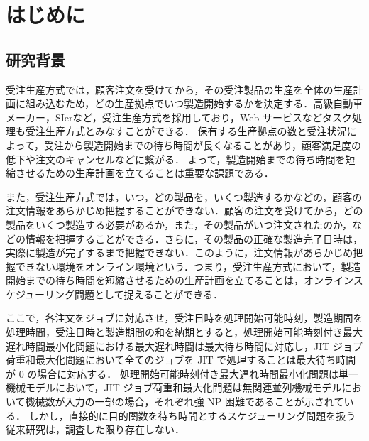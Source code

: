 \documentclass[12pt]{optlab-bachelor}
\begin{document}
\frontmatter

\chapter{はじめに}\label{c_1}
\section{研究背景}


受注生産方式では，顧客注文を受けてから，その受注製品の生産を全体の生産計画に組み込むため，どの生産拠点でいつ製造開始するかを決定する．高級自動車メーカー，SIerなど，受注生産方式を採用しており，Web サービスなどタスク処理も受注生産方式とみなすことができる．
保有する生産拠点の数と受注状況によって，受注から製造開始までの待ち時間が長くなることがあり，顧客満足度の低下や注文のキャンセルなどに繋がる．
よって，製造開始までの待ち時間を短縮させるための生産計画を立てることは重要な課題である．

また，受注生産方式では，いつ，どの製品を，いくつ製造するかなどの，顧客の注文情報をあらかじめ把握することができない．顧客の注文を受けてから，どの製品をいくつ製造する必要があるか，また，その製品がいつ注文されたのか，などの情報を把握することができる．さらに，その製品の正確な製造完了日時は，実際に製造が完了するまで把握できない．このように，注文情報があらかじめ把握できない環境をオンライン環境という．つまり，受注生産方式において，製造開始までの待ち時間を短縮させるための生産計画を立てることは，オンラインスケジューリング問題として捉えることができる．

ここで，各注文をジョブに対応させ，受注日時を処理開始可能時刻，製造期間を処理時間，受注日時と製造期間の和を納期とすると，処理開始可能時刻付き最大遅れ時間最小化問題における最大遅れ時間は最大待ち時間に対応し，JIT ジョブ荷重和最大化問題において全てのジョブを JIT で処理することは最大待ち時間が 0 の場合に対応する． 処理開始可能時刻付き最大遅れ時間最小化問題は単一機械モデルにおいて，JIT ジョブ荷重和最大化問題は無関連並列機械モデルにおいて機械数が入力の一部の場合，それぞれ強 NP 困難であることが示されている．
しかし，直接的に目的関数を待ち時間とするスケジューリング問題を扱う従来研究は，調査した限り存在しない．

\end{document}
